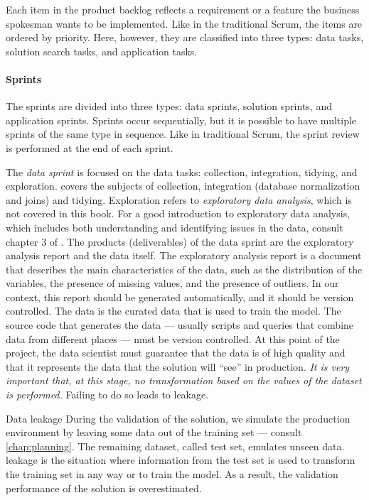 Each item in the product backlog reflects a requirement or a feature the business
spokesman wants to be implemented.  Like in the traditional Scrum, the items are ordered
by priority.  Here, however, they are classified into three types: data tasks, solution
search tasks, and application tasks.

\paragraph{Sprints}

The sprints are divided into three types: data sprints, solution sprints, and application
sprints.  Sprints occur sequentially, but it is possible to have multiple sprints of the
same type in sequence.  Like in traditional Scrum, the sprint review is performed at the
end of each sprint.

The \emph{data sprint} is focused on the data tasks: collection, integration, tidying, and
exploration.   covers the subjects of collection, integration (database
normalization and joins) and tidying.  Exploration refers to \emph{exploratory
data analysis}, which is not covered in this book. %
For a good introduction to exploratory data analysis, which includes both understanding
and identifying issues in the data, consult chapter 3 of
\textcite{Zumel2019}.
The products (deliverables) of the data sprint are the exploratory analysis report and the
data itself.  The exploratory analysis report is a document that describes the main
characteristics of the data, such as the distribution of the variables, the presence of
missing values, and the presence of outliers.  In our context, this report should be
generated automatically, and it should be version controlled.  The data is the curated
data that is used to train the model.  The source code that generates the data ---
usually scripts and queries that combine data from different places --- must be version
controlled.  At this point of the project, the data scientist must guarantee that the data
is of high quality and that it represents the data that the solution will ``see'' in
production.  \emph{It is very important that, at this stage, no transformation based
on the values of the dataset is performed.}  Failing to do so leads to \gls{leakage}.

\begin{defbox}{Data leakage}{}
  During the validation of the solution, we simulate the production environment by leaving
  some data out of the training set --- consult \cref{chap:planning}.  The remaining
  dataset, called test set, emulates unseen data.  \Gls{leakage} is the situation where
  information from the test set is used to transform the training set in any way or to
  train the model.  As a result, the validation performance of the solution is
  overestimated.
\end{defbox}

